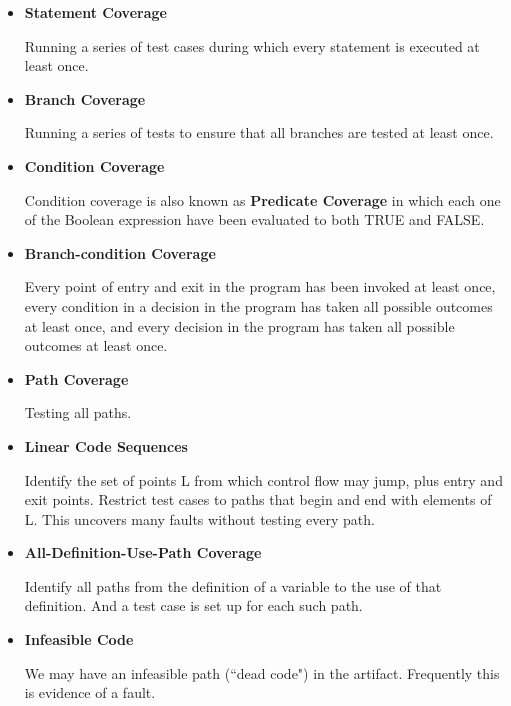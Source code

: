 \documentclass[11pt]{article}
\begin{document}
\begin{itemize}

	\item \textbf{Statement Coverage}
	
	Running a series of test cases during which every statement is executed at least once.
	
	\item \textbf{Branch Coverage}
	
	Running a series of tests to ensure that all branches are tested at least once.
	
	\item \textbf{Condition Coverage}
	
	Condition coverage is also known as \textbf{Predicate Coverage} in which each one of the Boolean expression have been evaluated to both TRUE and FALSE.
	
	\item \textbf{Branch-condition Coverage}
	
	Every point of entry and exit in the program has been invoked at least once, every condition in a decision in the program has taken all possible outcomes at least once, and every decision in the program has taken all possible outcomes at least once.
	
	\item \textbf{Path Coverage}
	
	Testing all paths.
	
	\item \textbf{Linear Code Sequences}
	
	Identify the set of points L from which control flow may jump, plus entry and exit points. Restrict test cases to paths that begin and end with elements of L. This uncovers many faults without testing every path.
	
	\item \textbf{All-Definition-Use-Path Coverage}
	
	Identify all paths from the definition of a variable to the use of that definition. And a test case is set up for each such path.
	
	\item \textbf{Infeasible Code}
	
	We may have an infeasible path (``dead code") in the artifact. Frequently this is evidence of a fault.

\end{itemize}
\end{document}
